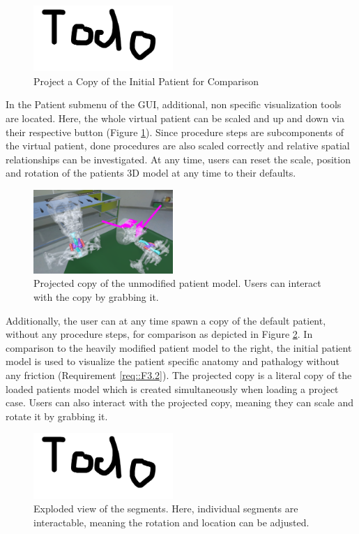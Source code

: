 \begin{figure}[ht]
  \centering
  \includegraphics[width=200px]{images/todo.png}
  \caption{\label{fig::PatientVisualization} Project a Copy of the Initial Patient for Comparison}
\end{figure}

In the Patient submenu of the GUI, additional, non specific visualization tools are located.
Here, the whole virtual patient can be scaled and up and down via their respective button (Figure \ref{fig::PatientVisualization}).
Since procedure steps are subcomponents of the virtual patient, done procedures are also scaled correctly and relative spatial relationships can be investigated. 
At any time, users can reset the scale, position and rotation of the patients 3D model at any time to their defaults.

\begin{figure}[ht]
  \centering
  \includegraphics[width=200px]{images/implementation/features/visualization/project_copy.png}
  \caption{\label{fig::ProjectCopy} Projected copy of the unmodified patient model. Users can interact with the copy by grabbing it.}
\end{figure}

Additionally, the user can at any time spawn a copy of the default patient, without any procedure steps, for comparison as depicted in Figure \ref{fig::ProjectCopy}.
In comparison to the heavily modified patient model to the right, the initial patient model is used to visualize the patient specific anatomy and pathalogy without any friction (Requirement \ref{req::F3.2}).
The projected copy is a literal copy of the loaded patients model which is created simultaneously when loading a project case.
Users can also interact with the projected copy, meaning they can scale and rotate it by grabbing it.

\begin{figure}[ht]
  \centering
  \includegraphics[width=200px]{images/todo.png}
  \caption{\label{fig::ExplodeView} Exploded view of the segments. Here, individual segments are interactable, meaning the rotation and location can be adjusted.}
\end{figure}

